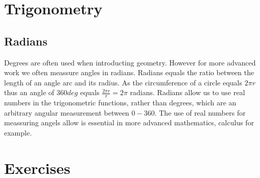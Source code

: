 \section{Trigonometry}

\subsection{Radians}
Degrees are often used when introducting geometry. However for more advanced  work we often meassure angles in radians. Radians equals the ratio between the length of an angle arc and its radius. As the circumference of a circle equals $2\pi r$ thus an angle of $360 deg$ equals $\frac{2\pi r}{r} = 2\pi$ radians. Radians allow us to use real numbers in the trigonometric functions, rather than degrees, which are an arbitrary angular measurement between $0-360$. The use of real numbers for meassuring angels allow is essential in more advanced mathematics, calculus for example.

\section{Exercises}
\begin{ExerciseList}


\end{ExerciseList}

